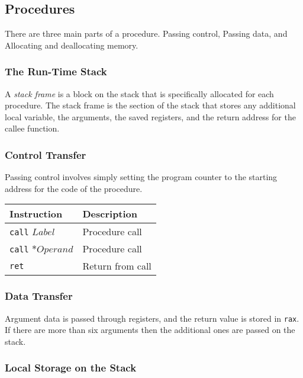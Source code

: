 \documentclass[10pt]{armath}
\newcommand{\s}[1]{\texttt{#1}}
\begin{document}
\subsection{Procedures}%
\label{sub:procedures}

There are three main parts of a procedure. Passing control, Passing data, and
Allocating and deallocating memory.

\subsubsection{The Run-Time Stack}%
\label{ssub:the_run_time_stack}

A \textit{stack frame} is a block on the stack that is specifically allocated
for each procedure. The stack frame is the section of the stack that stores any
additional local variable, the arguments, the saved registers, and the return
address for the callee function.

\subsubsection{Control Transfer}%
\label{ssub:control_transfer}

Passing control involves simply setting the program counter to the starting
address for the code of the procedure.

\begin{center}
  \begin{tabular}{l l}
    Instruction & Description\\
    \hline
    \s{call} $Label$ & Procedure call\\
    \s{call} $*Operand$ & Procedure call\\
    \s{ret} & Return from call\\
    \hline
  \end{tabular}
\end{center}

\subsubsection{Data Transfer}%
\label{ssub:data_transfer}

Argument data is passed through registers, and the return value is stored in
\s{rax}. If there are more than six arguments then the additional ones are
passed on the stack.

\subsubsection{Local Storage on the Stack}%
\label{ssub:local_storage_on_the_stack}
\end{document}
